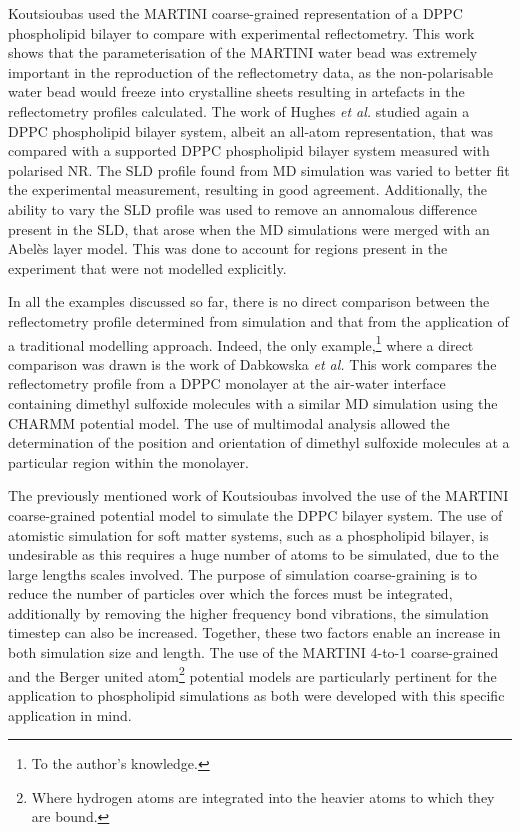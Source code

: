 Koutsioubas used the MARTINI coarse-grained representation of a DPPC phospholipid bilayer to compare with experimental reflectometry.\autocite{koutsioubas_combined_2016}
This work shows that the parameterisation of the MARTINI water bead was extremely important in the reproduction of the reflectometry data, as the non-polarisable water bead would freeze into crystalline sheets resulting in artefacts in the reflectometry profiles calculated.
The work of Hughes \emph{et al.} studied again a DPPC phospholipid bilayer system,\autocite{hughes_interpretation_2016} albeit an all-atom representation, that was compared with a supported DPPC phospholipid bilayer system measured with polarised NR.
The SLD profile found from MD simulation was varied to better fit the experimental measurement, resulting in good agreement.
Additionally, the ability to vary the SLD profile was used to remove an annomalous difference present in the SLD, that arose when the MD simulations were merged with an Abel\`{e}s layer model.
This was done to account for regions present in the experiment that were not modelled explicitly.

In all the examples discussed so far, there is no direct comparison between the reflectometry profile determined from simulation and that from the application of a traditional modelling approach.
Indeed, the only example,\footnote{To the author's knowledge.} where a direct comparison was drawn is the work of Dabkowska \emph{et al.}\autocite{dabkowska_modulation_2014}
This work compares the reflectometry profile from a DPPC monolayer at the air-water interface containing dimethyl sulfoxide molecules with a similar MD simulation using the CHARMM potential model.
The use of multimodal analysis allowed the determination of the position and orientation of dimethyl sulfoxide molecules at a particular region within the monolayer.

The previously mentioned work of Koutsioubas involved the use of the MARTINI coarse-grained potential model to simulate the DPPC bilayer system.\autocite{koutsioubas_combined_2016}
The use of atomistic simulation for soft matter systems, such as a phospholipid bilayer, is undesirable as this requires a huge number of atoms to be simulated, due to the large lengths scales involved.
The purpose of simulation coarse-graining is to reduce the number of particles over which the forces must be integrated, additionally by removing the higher frequency bond vibrations, the simulation timestep can also be increased.\autocite{pluhackova_biomembranes_2015}
Together, these two factors enable an increase in both simulation size and length.
The use of the MARTINI 4-to-1 coarse-grained and the Berger united atom\footnote{Where hydrogen atoms are integrated into the heavier atoms to which they are bound.} potential models are particularly pertinent for the application to phospholipid simulations as both were developed with this specific application in mind.\autocite{marrink_martini_2007,berger_molecular_1997}

